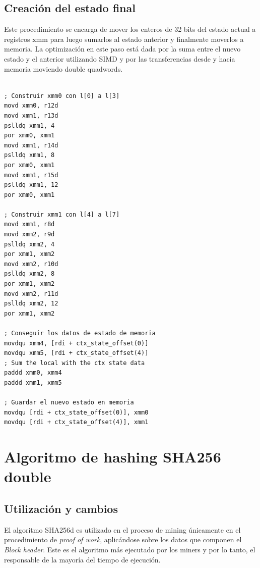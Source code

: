 \documentclass[a4paper, 10pt, twoside]{article}
\begin{document}
\subsection{Creación del estado final}

Este procedimiento se encarga de mover los enteros de 32 bits del estado actual a registros xmm para luego sumarlos al estado anterior y finalmente moverlos a memoria. La optimización en este paso está dada por la suma entre el nuevo estado y el anterior utilizando SIMD y por las transferencias desde y hacia memoria moviendo double quadwords.

\begin{verbatim}

; Construir xmm0 con l[0] a l[3]
movd xmm0, r12d
movd xmm1, r13d
pslldq xmm1, 4
por xmm0, xmm1
movd xmm1, r14d
pslldq xmm1, 8
por xmm0, xmm1
movd xmm1, r15d
pslldq xmm1, 12
por xmm0, xmm1

; Construir xmm1 con l[4] a l[7]
movd xmm1, r8d
movd xmm2, r9d
pslldq xmm2, 4
por xmm1, xmm2
movd xmm2, r10d
pslldq xmm2, 8
por xmm1, xmm2
movd xmm2, r11d
pslldq xmm2, 12
por xmm1, xmm2

; Conseguir los datos de estado de memoria
movdqu xmm4, [rdi + ctx_state_offset(0)]
movdqu xmm5, [rdi + ctx_state_offset(4)]
; Sum the local with the ctx state data
paddd xmm0, xmm4
paddd xmm1, xmm5

; Guardar el nuevo estado en memoria
movdqu [rdi + ctx_state_offset(0)], xmm0
movdqu [rdi + ctx_state_offset(4)], xmm1

\end{verbatim}


\section{Algoritmo de hashing SHA256 double}

\subsection{Utilización y cambios}

El algoritmo SHA256d es utilizado en el proceso de mining únicamente en el procedimiento de \textit{proof of work}, aplicándose sobre los datos que componen el \textit{Block header}. Este es el algoritmo más ejecutado por los miners y por lo tanto, el responsable de la mayoría del tiempo de ejecución.
\end{document}
